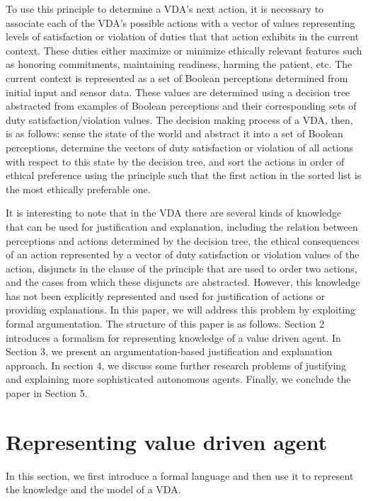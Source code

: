 \documentclass[letterpaper]{article} %
\begin{document}
To use this principle to determine a VDA's next action, it is necessary to associate each of the VDA's possible actions with a vector of values representing levels of satisfaction or violation of duties that that action exhibits in the current context. These duties either maximize or minimize ethically relevant features such as honoring commitments, maintaining readiness, harming the patient, etc.   The current context is represented as a set of Boolean perceptions determined from initial input and sensor data. These values are determined using a decision tree abstracted from examples of Boolean perceptions and their corresponding sets of duty satisfaction/violation values.  The decision making process of a VDA, then, is as follows:  sense the state of the world and abstract it into a set of Boolean perceptions, determine the vectors of duty satisfaction or violation of all actions with respect to this state by the decision tree, and sort the actions in order of ethical preference using the principle such that the first action in the sorted list is the most ethically preferable one.

It is interesting to note that in the VDA there are several kinds of knowledge that can be used for justification and explanation, including the relation between perceptions and actions determined by the decision tree, the ethical consequences of an action represented by a vector of duty satisfaction or violation values of the action,  disjuncts in the clause of the principle that are used to order two actions, and the cases from which these disjuncts are abstracted. However, this knowledge has not been explicitly represented and used for justification of actions or providing explanations. In this paper, we will address this problem by exploiting formal argumentation. 
The structure of this paper is as follows. Section 2 introduces a formalism for representing knowledge of a value driven agent. In Section 3, we present an argumentation-based justification and explanation approach. In section 4, we discuss some further research problems of justifying and explaining more sophisticated autonomous agents. Finally, we conclude the paper in Section 5. 


\section{Representing value driven agent}
In this section, we first introduce a formal language and then use it to represent the knowledge and the model of a VDA. 
\end{document}
